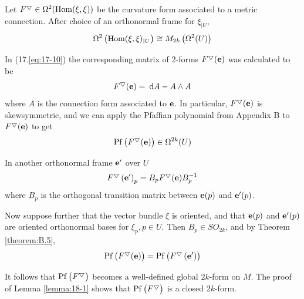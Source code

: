 Let $F^{\bigtriangledown} \in \Omega^{2}(\mathrm{Hom}(\xi, \xi))$ be the curvature form associated to a metric connection. 
After choice of an orthonormal frame for $\xi_{\mid U}$,
\[
  \Omega^{2}\left(\mathrm{Hom}(\xi, \xi)_{\mid U}\right) \cong M_{2 k}\left(\Omega^{2}(U)\right)
\]

In (17.\ref{eq:17-10}) the corresponding matrix of 2-forms $F^{\bigtriangledown}(\mathbf{e})$  was calculated to be
\[
  F^{\btd}(\F{e})=\dd A-A \wedge A
\]
where $A$ is the connection form associated to $\mathbf{e}$. In particular, $F^{\bigtriangledown}(\mathbf{e})$ is skewsymmetric, 
and we can apply the Pfaffian polynomial from Appendix B to $F^{\bigtriangledown}(\mathbf{e})$  to get
\begin{equation}\label{eq:19-1}
  \mathrm{Pf}\left(F^{\bigtriangledown}(\mathbf{e})\right) \in \Omega^{2 k}(U)
\end{equation}


In another orthonormal frame $\mathbf{e}^{\prime}$ over $U$
\begin{equation}\label{eq:19-2}
  F^{\bigtriangledown}\left(\mathbf{e}^{\prime}\right)_{p}=B_{p} F^{\bigtriangledown}(\mathbf{e}) B_{p}^{-1}
\end{equation}
where $B_{p}$ is the orthogonal transition matrix between $\mathbf{e}(p)$ and $\mathbf{e}^{\prime}(p)$.

Now suppose further that the vector bundle $\xi$ is oriented, and that $\mathbf{e}(p)$ and $\mathbf{e}^{\prime}(p)$ 
are oriented orthonormal bases for $\xi_{p}, p \in U$. Then $B_{p} \in S O_{2 k}$, and by Theorem \ref{theorem:B.5},
\begin{equation}\label{eq:19-3}
\mathrm{Pf}\left(F^{\bigtriangledown}(\mathbf{e})\right)=\mathrm{Pf}\left(F^{\bigtriangledown}\left(\mathbf{e}^{\prime}\right)\right)
\end{equation}


It follows that $\mathrm{Pf}\left(F^{\bigtriangledown}\right)$ becomes a well-defined global $2 k$-form on $M$. The proof 
of Lemma \ref{lemma:18-1} shows that $\mathrm{Pf}\left(F^{\bigtriangledown}\right)$ is a closed $2 k$-form.

